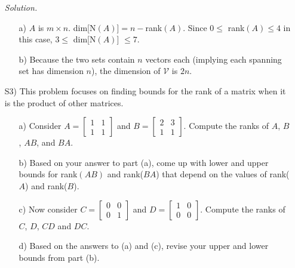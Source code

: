 \documentclass[12pt]{article}
\begin{document}
\begin{itemize}
\textit{Solution.}
\begin{itemize}
\item[a)] $A$ is $m \times n$. dim[N$(A)$]$=n -$rank$(A)$. Since $0 \leq$ rank$(A) \leq 4$ in this case, 
	$3 \leq$ dim[N$(A)$] $\leq 7$.
\item[b)] Because the two sets contain $n$ vectors each (implying each spanning set has dimension $n$), the dimension of $\mathcal{V}$ is $2n$. 
\end{itemize}


\item[S3)] This problem focuses on finding bounds for the rank of a matrix when it is the product of other matrices.  
\begin{itemize}
\item[a)] Consider $A = \left[\begin{array}{ccc}  1 & 1\\ 1  & 1\end{array}\right]$ and $B= \left[\begin{array}{ccc}2 & 3\\ 1 & 1 \end{array}\right]$.  Compute the ranks of $A$, $B$, $AB$, and $BA$.
\item[b)] Based on your answer to part (a), come up with lower and upper bounds for rank$(AB)$ and rank($BA$) that depend on the values of rank($A$) and rank($B$). 
\item[c)] Now consider $C=\left[\begin{array}{cc} 0 & 0\\ 0 &1 \end{array}\right]$ and $D=\left[\begin{array}{cc} 1 & 0\\ 0 &0 \end{array}\right]$.  Compute the ranks of $C$, $D$, $CD$ and $DC$.
\item[d)] Based on the answers to (a) and (c), revise your upper and lower bounds from part (b).
\end{itemize}


\end{itemize}
\end{document}
